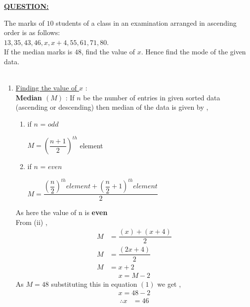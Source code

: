 \documentclass[journal,12pt,twocolumn]{IEEEtran}
\begin{document}
\begin{flushleft}
	\begin{large}
		\underline{\underline{\textbf{QUESTION:}}} \\[8pt]
	\end{large}
The marks of $10$ students of a class in an examination arranged in ascending order
is as follows:\\
$13, 35, 43, 46, x, x+4, 55, 61, 71, 80$.\\
If the median marks is $48$, find the value of $x$. Hence find the mode of the given
data.\\[9pt]
\solution \\[8pt]
\begin{enumerate}
\item \underline{Finding the value of $x$} :\\[8pt]
\textbf{Median $(M)$} : If $n$ be the number of entries in given sorted data (ascending or descending) then median of the data is given by ,\\

	\begin{enumerate}[label=(\roman*)]
		\item if $n$ = $odd$ 
		\begin{center}
		    $ M= \left(\dfrac{n+1}{2}\right)^{th}$ element
		\end{center}
		
		\item if $n$ = $even$\\[6pt]
		\begin{center}
		    $ M= \dfrac{{\left(\dfrac{n}{2}\right)}^{th}element+\left(\dfrac{n}{2}+1\right)^{th}element}{2}$ \\[10pt]
		\end{center} 
	\end{enumerate}
As here the value of n is \textbf{even}\\
	From (ii) ,
	\begin{align*}
		 M &= \dfrac{(x)+(x+4)}{2}\\
	 	 M &= \dfrac{(2x+4)}{2}\\
		 M &= x+2
	\end{align*}	
	\begin{align}
	 x = M-2
	\end{align}
As $M=48$ substituting this in equation $(1)$ we get ,
   \begin{align*}
		 x = 48-2
	\end{align*}
%
	\begin{align}
		\therefore x &=46
	\end{align}
	

\end{enumerate}
\end{flushleft}
\end{document}
